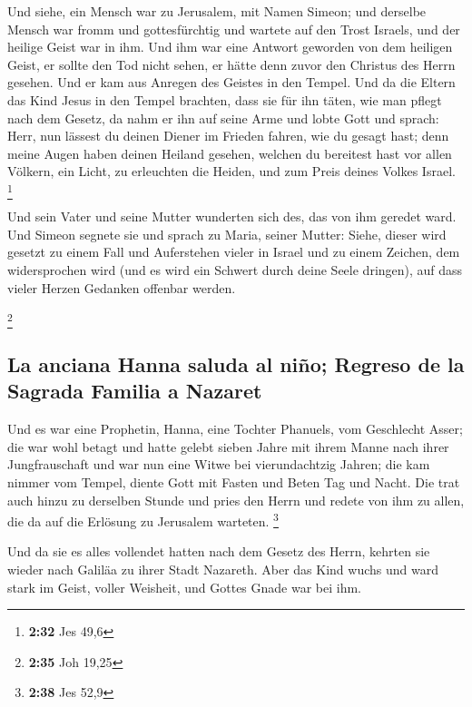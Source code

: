 Und siehe, ein Mensch war zu Jerusalem, mit Namen
Simeon; und derselbe Mensch war fromm und gottesfürchtig und wartete auf
den Trost Israels, und der heilige Geist war in ihm.  Und
ihm war eine Antwort geworden von dem heiligen Geist, er sollte den Tod
nicht sehen, er hätte denn zuvor den Christus des Herrn gesehen.
 Und er kam aus Anregen des Geistes in den Tempel. Und da
die Eltern das Kind Jesus in den Tempel brachten, dass sie für ihn
täten, wie man pflegt nach dem Gesetz,  da nahm er ihn
auf seine Arme und lobte Gott und sprach:  Herr, nun
lässest du deinen Diener im Frieden fahren, wie du gesagt hast;
 denn meine Augen haben deinen Heiland gesehen,
 welchen du bereitest hast vor allen Völkern,
 ein Licht, zu erleuchten die Heiden, und zum Preis
deines Volkes Israel. \footnote{\textbf{2:32} Jes 49,6}

 Und sein Vater und seine Mutter wunderten sich des, das
von ihm geredet ward.  Und Simeon segnete sie und sprach
zu Maria, seiner Mutter: Siehe, dieser wird gesetzt zu einem Fall und
Auferstehen vieler in Israel und zu einem Zeichen, dem widersprochen
wird  (und es wird ein Schwert durch deine Seele
dringen), auf dass vieler Herzen Gedanken offenbar werden.

\footnote{\textbf{2:35} Joh 19,25}

\hypertarget{la-anciana-hanna-saluda-al-niuxf1o-regreso-de-la-sagrada-familia-a-nazaret}{%
\subsection{La anciana Hanna saluda al niño; Regreso de la Sagrada
Familia a
Nazaret}\label{la-anciana-hanna-saluda-al-niuxf1o-regreso-de-la-sagrada-familia-a-nazaret}}

 Und es war eine Prophetin, Hanna, eine Tochter Phanuels,
vom Geschlecht Asser; die war wohl betagt und hatte gelebt sieben Jahre
mit ihrem Manne nach ihrer Jungfrauschaft  und war nun
eine Witwe bei vierundachtzig Jahren; die kam nimmer vom Tempel, diente
Gott mit Fasten und Beten Tag und Nacht.  Die trat auch
hinzu zu derselben Stunde und pries den Herrn und redete von ihm zu
allen, die da auf die Erlösung zu Jerusalem warteten. \footnote{\textbf{2:38}
  Jes 52,9}

 Und da sie es alles vollendet hatten nach dem Gesetz des
Herrn, kehrten sie wieder nach Galiläa zu ihrer Stadt Nazareth.
 Aber das Kind wuchs und ward stark im Geist, voller
Weisheit, und Gottes Gnade war bei ihm.

